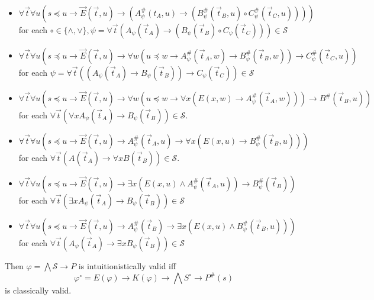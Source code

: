 \documentclass[a4paper,12pt]{report}
\theoremstyle{definition}
\theoremstyle{definition}
\theoremstyle{definition}
\theoremstyle{definition}
\theoremstyle{definition}
\theoremstyle{definition}
\theoremstyle{definition}
\begin{document}
	\begin{itemize}
		\item $\forall \vec t\forall u(s\preceq u\to\vec E(\vec t, u)\to (A_\psi^\#(t_A, u)\to (B_\psi^\#(\vec t_B, u)\circ C_\psi^\#(\vec t_C, u))))$\\for each $\circ\in\{\wedge, \vee\}, \psi = \forall \vec t(A_\psi(\vec t_A)\to (B_\psi(\vec t_B)\circ C_\psi(\vec t_C)))\in\mathcal S$
		\item $\forall \vec t\forall u(s\preceq u\to\vec E(\vec t, u)\to \forall w(u\preceq w\to A_\psi^\#(\vec t_A, w)\to B_\psi^\#(\vec t_B, w))\to C_\psi^\#(\vec t_C, u))$ for each $\psi = \forall \vec t((A_\psi(\vec t_A)\to B_\psi(\vec t_B))\to C_\psi(\vec t_C))\in\mathcal S$
		\item  $\forall \vec t\forall u(s\preceq u\to\vec E(\vec t, u)\to \forall w(u\preceq w\to \forall x(E(x, w)\to A_\psi^\#(\vec t_A, w)))\to B^\#(\vec t_B, u))$ for each $\forall \vec t(\forall xA_\psi(\vec t_A)\to B_\psi(\vec t_B))\in\mathcal S$.
		\item $\forall \vec t\forall u(s\preceq u\to\vec E(\vec t, u)\to A^\#_\psi(\vec t_A, u)\to \forall x(E(x, u)\to B^\#_\psi(\vec t_B, u)))$\\for each $\forall \vec t(A(\vec t_A)\to \forall xB(\vec t_B))\in\mathcal S$.
		\item $\forall \vec t\forall u(s\preceq u\to\vec E(\vec t, u)\to \exists x(E(x, u)\wedge A^\#_\psi(\vec t_A, u))\to B^\#_\psi(\vec t_B))$\\for each $\forall \vec t(\exists xA_\psi(\vec t_A)\to B_\psi(\vec t_B))\in\mathcal S$
		\item $\forall \vec t\forall u(s\preceq u\to\vec E(\vec t, u)\to A^\#_\psi(\vec t_B)\to \exists x(E(x, u)\wedge B^\#_\psi(\vec t_B, u)))$\\for each $\forall \vec t(A_\psi(\vec t_A)\to \exists xB_\psi(\vec t_B))\in\mathcal S$
	\end{itemize}
	Then $\varphi = \bigwedge\mathcal S\to P$ is intuitionistically valid iff
	$$\varphi^\circ= E(\varphi)\to K(\varphi)\to \bigwedge S^\circ\to P^\#(s)$$
	is classically valid.
	
\end{document}
